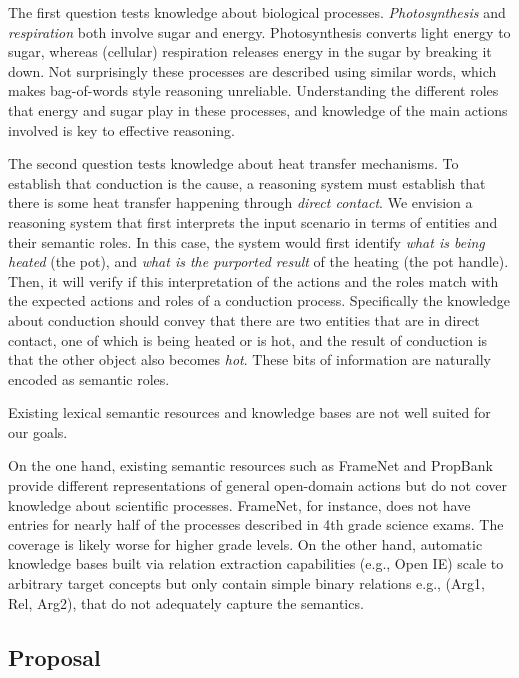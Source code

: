 The first question tests knowledge about biological processes.
{\em Photosynthesis} and {\em respiration} both involve sugar and energy. 
Photosynthesis converts light energy to sugar, whereas (cellular) respiration releases energy in the sugar by breaking it down. 
Not surprisingly these processes are described using similar words, which makes bag-of-words style reasoning unreliable. 
Understanding the different roles that energy and sugar play in these processes, and knowledge of the main actions involved is key to effective reasoning.

The second question tests knowledge about heat transfer mechanisms.
To establish that conduction is the cause, a reasoning system must establish that there is some heat transfer happening through {\em direct contact}. 
We envision a reasoning system that first interprets the input scenario in terms of entities and their semantic roles. 
In this case, the system would first identify {\em what is being heated} (the pot), and {\em what is the purported result} of the heating (the pot handle). 
Then, it will verify if this interpretation of the actions and the roles match with the expected actions and roles of a conduction process. 
Specifically the knowledge about conduction should convey that there are two entities that are in direct contact, one of which is being heated or is hot, 
and the result of conduction is that the other object also becomes {\em hot}. 
These bits of information are naturally encoded as semantic roles.

Existing lexical semantic resources and knowledge bases are not well suited for our goals.

On the one hand, existing semantic resources such as FrameNet and PropBank provide different representations of 
general open-domain actions but do not cover knowledge about scientific processes. 
FrameNet, for instance, does not have entries for nearly half of the processes described in 4th grade science exams. 
The coverage is likely worse for higher grade levels. 
On the other hand, automatic knowledge bases built via relation extraction
capabilities (e.g., Open IE) scale to arbitrary target concepts but only contain simple binary relations e.g., (Arg1, Rel, Arg2), that do not adequately capture the semantics.


\subsection{Proposal}

